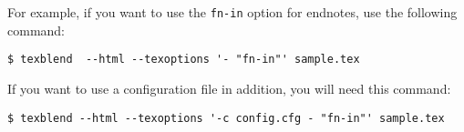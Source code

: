 For example, if you want to use the \verb|fn-in| option for endnotes, use the following command:

\begin{verbatim}
$ texblend  --html --texoptions '- "fn-in"' sample.tex
\end{verbatim}

If you want to use a configuration file in addition, you will need this command:

\begin{verbatim}
$ texblend --html --texoptions '-c config.cfg - "fn-in"' sample.tex
\end{verbatim}
